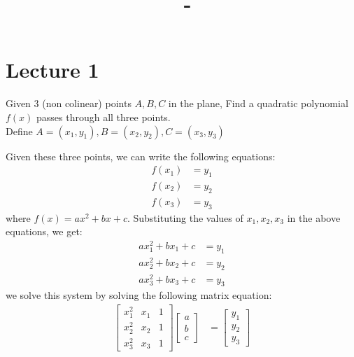 \documentclass[answers,12pt,addpoints]{exam}
\author{\name}
\title{\course \ - \assignment}
\begin{document}
\maketitle


\newpage
\section*{Lecture 1}
\begin{questions}
    \question Given 3 (non colinear) points $A, B, C$ in the plane, Find a quadratic polynomial $f(x)$ passes through all three points.\\
    Define $A = (x_1, y_1), B = (x_2, y_2), C = (x_3, y_3)$
    \begin{solution}
        Given these three points, we can write the following equations:
        \begin{align*}
            f(x_1) &= y_1\\
            f(x_2) &= y_2\\
            f(x_3) &= y_3
        \end{align*}
        where $f(x) = ax^2 + bx + c$. Substituting the values of $x_1, x_2, x_3$ in the above equations, we get:
        \begin{align*}
            ax_1^2 + bx_1 + c &= y_1\\
            ax_2^2 + bx_2 + c &= y_2\\
            ax_3^2 + bx_3 + c &= y_3
        \end{align*}
        we solve this system by solving the following matrix equation:
        \begin{align*}
            \begin{bmatrix}
                x_1^2 & x_1 & 1\\
                x_2^2 & x_2 & 1\\
                x_3^2 & x_3 & 1
            \end{bmatrix}
            \begin{bmatrix}
                a\\
                b\\
                c
            \end{bmatrix}
            &=
            \begin{bmatrix}
                y_1\\
                y_2\\
                y_3
            \end{bmatrix}
        \end{align*}

\end{solution}
\end{questions}
\end{document}
